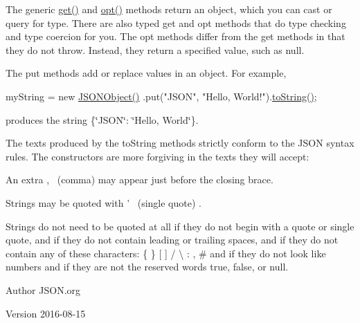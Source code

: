 The generic {\ttfamily \hyperlink{classorg_1_1json_1_1JSONObject_ac98329762a354373a0d3fddc2855dd61}{get()}} and {\ttfamily \hyperlink{classorg_1_1json_1_1JSONObject_a51eeabb3fde00474d3ffd7381ad5d311}{opt()}} methods return an object, which you can cast or query for type. There are also typed {\ttfamily get} and {\ttfamily opt} methods that do type checking and type coercion for you. The opt methods differ from the get methods in that they do not throw. Instead, they return a specified value, such as null. 

The {\ttfamily put} methods add or replace values in an object. For example,


\begin{DoxyPre}
myString = new \hyperlink{classorg_1_1json_1_1JSONObject_a7c17e59daff74ce50c6677c6f5da233d}{JSONObject()}
        .put("JSON", "Hello, World!").\hyperlink{classorg_1_1json_1_1JSONObject_a7f8cab6eb354ceb416a421574b4be424}{toString()};
\end{DoxyPre}


produces the string {\ttfamily \{\char`\"{}\-J\-S\-O\-N\char`\"{}\-: \char`\"{}\-Hello, World\char`\"{}\}}. 

The texts produced by the {\ttfamily to\-String} methods strictly conform to the J\-S\-O\-N syntax rules. The constructors are more forgiving in the texts they will accept\-: 
\begin{DoxyItemize}
\item An extra {\ttfamily ,}~
\footnotesize (comma)
\normalsize  may appear just before the closing brace. 
\item Strings may be quoted with {\ttfamily '}~
\footnotesize (single quote)
\normalsize . 
\item Strings do not need to be quoted at all if they do not begin with a quote or single quote, and if they do not contain leading or trailing spaces, and if they do not contain any of these characters\-: {\ttfamily \{ \} \mbox{[} \mbox{]} / \textbackslash{} \-: , \#} and if they do not look like numbers and if they are not the reserved words {\ttfamily true}, {\ttfamily false}, or {\ttfamily null}. 
\end{DoxyItemize}

\begin{DoxyAuthor}{Author}
J\-S\-O\-N.\-org 
\end{DoxyAuthor}
\begin{DoxyVersion}{Version}
2016-\/08-\/15 
\end{DoxyVersion}


